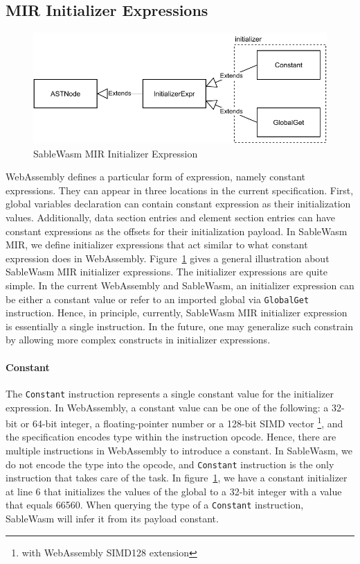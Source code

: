 \subsection{MIR Initializer Expressions}

\begin{figure}
  \centering
  \includegraphics[width=\textwidth]{Images/4.MIR/initalizer-expression.pdf}
  \caption{SableWasm MIR Initializer Expression}
  \label{fig:sablewasm-mir-initializer-expression}
\end{figure}
   
WebAssembly defines a particular form of expression, namely constant expressions. They can appear in three locations in the current specification. First, global variables declaration can contain constant expression as their initialization values. Additionally, data section entries and element section entries can have constant expressions as the offsets for their initialization payload. In SableWasm MIR, we define initializer expressions that act similar to what constant expression does in WebAssembly. Figure~\ref{fig:sablewasm-mir-initializer-expression} gives a general illustration about SableWasm MIR initializer expressions. The initializer expressions are quite simple. In the current WebAssembly and SableWasm, an initializer expression can be either a constant value or refer to an imported global via \texttt{GlobalGet} instruction. Hence, in principle, currently, SableWasm MIR initializer expression is essentially a single instruction. In the future, one may generalize such constrain by allowing more complex constructs in initializer expressions. 

\paragraph{Constant}
The \texttt{Constant} instruction represents a single constant value for the initializer expression. In WebAssembly, a constant value can be one of the following: a 32-bit or 64-bit integer, a floating-pointer number or a 128-bit SIMD vector \footnote{with WebAssembly SIMD128 extension}, and the specification encodes type within the instruction opcode. Hence, there are multiple instructions in WebAssembly to introduce a constant. In SableWasm, we do not encode the type into the opcode, and \texttt{Constant} instruction is the only instruction that takes care of the task. In figure~\ref{fig:sablewasm-mir-initializer-expression}, we have a constant initializer at line 6 that initializes the values of the global to a 32-bit integer with a value that equals 66560. When querying the type of a \texttt{Constant} instruction, SableWasm will infer it from its payload constant.

